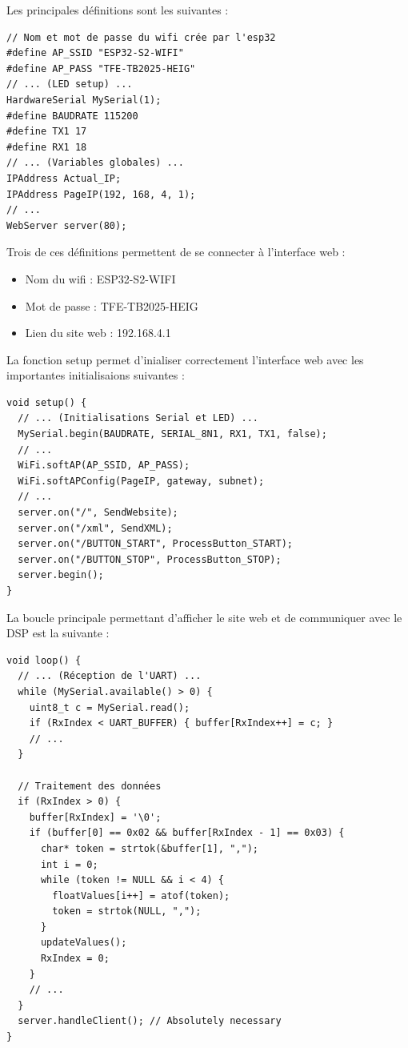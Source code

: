 Les principales définitions sont les suivantes :

\begin{verbatim}
// Nom et mot de passe du wifi crée par l'esp32
#define AP_SSID "ESP32-S2-WIFI"
#define AP_PASS "TFE-TB2025-HEIG"
// ... (LED setup) ...
HardwareSerial MySerial(1);
#define BAUDRATE 115200
#define TX1 17
#define RX1 18
// ... (Variables globales) ...
IPAddress Actual_IP;
IPAddress PageIP(192, 168, 4, 1);
// ...
WebServer server(80);
\end{verbatim}

Trois de ces définitions permettent de se connecter à l'interface web :

\begin{itemize}
    \item Nom du wifi : ESP32-S2-WIFI
    \item Mot de passe : TFE-TB2025-HEIG
    \item Lien du site web : 192.168.4.1
\end{itemize}

La fonction setup permet d'inialiser correctement l'interface web avec les importantes initialisaions suivantes :

\begin{verbatim}
void setup() {
  // ... (Initialisations Serial et LED) ...
  MySerial.begin(BAUDRATE, SERIAL_8N1, RX1, TX1, false);
  // ...
  WiFi.softAP(AP_SSID, AP_PASS);
  WiFi.softAPConfig(PageIP, gateway, subnet);
  // ...
  server.on("/", SendWebsite);
  server.on("/xml", SendXML);
  server.on("/BUTTON_START", ProcessButton_START);
  server.on("/BUTTON_STOP", ProcessButton_STOP);
  server.begin();
}
\end{verbatim}

La boucle principale permettant d'afficher le site web et de communiquer avec le DSP est la suivante :

\begin{verbatim}
void loop() {
  // ... (Réception de l'UART) ...
  while (MySerial.available() > 0) {
    uint8_t c = MySerial.read();
    if (RxIndex < UART_BUFFER) { buffer[RxIndex++] = c; }
    // ...
  }

  // Traitement des données
  if (RxIndex > 0) {
    buffer[RxIndex] = '\0';
    if (buffer[0] == 0x02 && buffer[RxIndex - 1] == 0x03) {
      char* token = strtok(&buffer[1], ",");
      int i = 0;
      while (token != NULL && i < 4) {
        floatValues[i++] = atof(token);
        token = strtok(NULL, ",");
      }
      updateValues();
      RxIndex = 0;
    }
    // ...
  }
  server.handleClient(); // Absolutely necessary
}
\end{verbatim}

